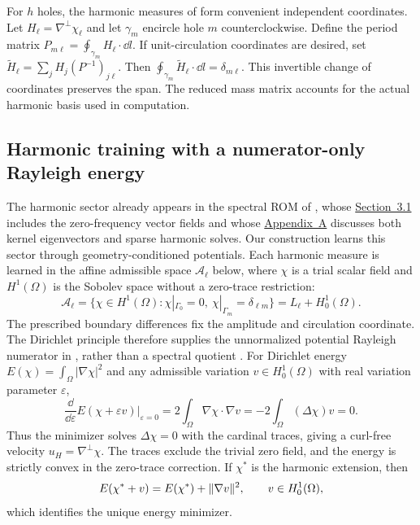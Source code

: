 For $h$ holes, the harmonic measures of  form convenient independent coordinates. Let $H_\ell=\nabla^\perp\chi_\ell$ and let $\gamma_m$ encircle hole $m$ counterclockwise. Define the period matrix $P_{m\ell}=\oint_{\gamma_m}H_\ell\cdot\dd l$. If unit-circulation coordinates are desired, set $\widetilde H_\ell=\sum_jH_j(P^{-1})_{j\ell}$. Then $\oint_{\gamma_m}\widetilde H_\ell\cdot\dd l=\delta_{m\ell}$. This invertible change of coordinates preserves the span. The reduced mass matrix accounts for the actual harmonic basis used in computation.

\subsection{Harmonic training with a numerator-only Rayleigh energy}
\label{app:harmonic-loss}
The harmonic sector already appears in the spectral ROM of \citet{liu2015model}, whose \href{https://doi.org/10.1145/2816795.2818130}{Section~3.1} includes the zero-frequency vector fields and whose \href{https://doi.org/10.1145/2816795.2818130}{Appendix~A} discusses both kernel eigenvectors and sparse harmonic solves. Our construction learns this sector through geometry-conditioned potentials. Each harmonic measure is learned in the affine admissible space $\mathcal A_\ell$ below, where $\chi$ is a trial scalar field and $H^1(\Omega)$ is the Sobolev space without a zero-trace restriction:
\begin{equation}
\mathcal A_\ell=\{\chi\in H^1(\Omega):\chi|_{\Gamma_0}=0,\ \chi|_{\Gamma_m}=\delta_{\ell m}\}
=L_\ell+H_0^1(\Omega).
\end{equation}
The prescribed boundary differences fix the amplitude and circulation coordinate. The Dirichlet principle therefore supplies the unnormalized potential Rayleigh numerator in , rather than a spectral quotient \citep{e2018deep}. For Dirichlet energy $E(\chi)=\int_\Omega|\nabla\chi|^2$ and any admissible variation $v\in H_0^1(\Omega)$ with real variation parameter $\varepsilon$,
\begin{equation}
\frac{\dd}{\dd\varepsilon}E(\chi+\varepsilon v)\bigg|_{\varepsilon=0}
=2\int_\Omega\nabla\chi\cdot\nabla v
=-2\int_\Omega(\Delta\chi)v=0.
\end{equation}
Thus the minimizer solves $\Delta\chi=0$ with the cardinal traces, giving a curl-free velocity $u_H=\nabla^\perp\chi$. The traces exclude the trivial zero field, and the energy is strictly convex in the zero-trace correction. If $\chi^*$ is the harmonic extension, then
\begin{equation}
E(\chi^*+v)=E(\chi^*)+\lVert \nabla v\rVert^2,\qquad v\in H_0^1(\Omega),
\end{equation}
which identifies the unique energy minimizer.

